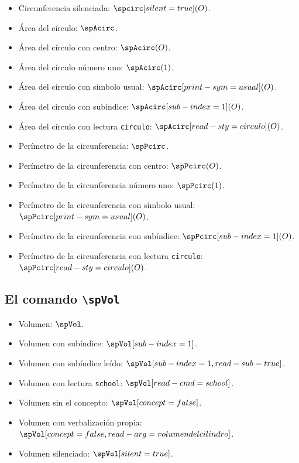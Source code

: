\documentclass{article}
\begin{document}
\begin{itemize}
  \item Circunferencia silenciada: $\spcirc[silent=true](O)$.
  \item Área del círculo: $\spAcirc$.
  \item Área del círculo con centro: $\spAcirc(O)$.
  \item Área del círculo número uno: $\spAcirc(1)$.
  \item Área del círculo con símbolo usual: $\spAcirc[print-sym=usual](O)$.
  \item Área del círculo con subíndice: $\spAcirc[sub-index={1}](O)$.
  \item Área del círculo con lectura \texttt{circulo}: $\spAcirc[read-sty=circulo](O)$.
  \item Perímetro de la circunferencia: $\spPcirc$.
  \item Perímetro de la circunferencia con centro: $\spPcirc(O)$.
  \item Perímetro de la circunferencia número uno: $\spPcirc(1)$.
  \item Perímetro de la circunferencia con símbolo usual: $\spPcirc[print-sym=usual](O)$.
  \item Perímetro de la circunferencia con subíndice: $\spPcirc[sub-index={1}](O)$.
  \item Perímetro de la circunferencia con lectura \texttt{circulo}: $\spPcirc[read-sty=circulo](O)$.
\end{itemize}

\subsection*{El comando \texttt{\textbackslash spVol}}

\begin{itemize}
  \item Volumen: $\spVol$.
  \item Volumen con subíndice: $\spVol[sub-index={1}]$.
  \item Volumen con subíndice leído: $\spVol[sub-index={1},read-sub=true]$.
  \item Volumen con lectura \texttt{school}: $\spVol[read-cmd=school]$.
  \item Volumen sin el concepto: $\spVol[concept=false]$.
  \item Volumen con verbalización propia: $\spVol[concept=false,read-arg={volumen del cilindro}]$.
  \item Volumen silenciado: $\spVol[silent=true]$.
\end{itemize}
\end{document}

